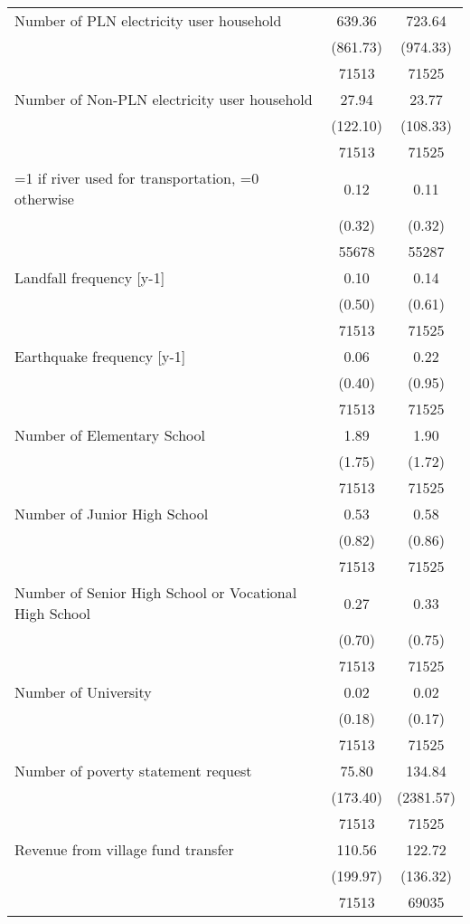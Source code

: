 \begin{tabular}{l*{2}{c}}
Number of PLN electricity user household&      639.36&      723.64\\
                    &    (861.73)&    (974.33)\\
                    &       71513&       71525\\
[1em]
Number of Non-PLN electricity user household&       27.94&       23.77\\
                    &    (122.10)&    (108.33)\\
                    &       71513&       71525\\
[1em]
=1 if river used for transportation, =0 otherwise&        0.12&        0.11\\
                    &      (0.32)&      (0.32)\\
                    &       55678&       55287\\
[1em]
Landfall frequency [y-1]&        0.10&        0.14\\
                    &      (0.50)&      (0.61)\\
                    &       71513&       71525\\
[1em]
Earthquake frequency [y-1]&        0.06&        0.22\\
                    &      (0.40)&      (0.95)\\
                    &       71513&       71525\\
[1em]
Number of Elementary School&        1.89&        1.90\\
                    &      (1.75)&      (1.72)\\
                    &       71513&       71525\\
[1em]
Number of Junior High School&        0.53&        0.58\\
                    &      (0.82)&      (0.86)\\
                    &       71513&       71525\\
[1em]
Number of Senior High School or Vocational High School&        0.27&        0.33\\
                    &      (0.70)&      (0.75)\\
                    &       71513&       71525\\
[1em]
Number of University&        0.02&        0.02\\
                    &      (0.18)&      (0.17)\\
                    &       71513&       71525\\
[1em]
Number of poverty statement request&       75.80&      134.84\\
                    &    (173.40)&   (2381.57)\\
                    &       71513&       71525\\
[1em]
Revenue from village fund transfer&      110.56&      122.72\\
                    &    (199.97)&    (136.32)\\
                    &       71513&       69035\\
\hline\hline
\end{tabular}
